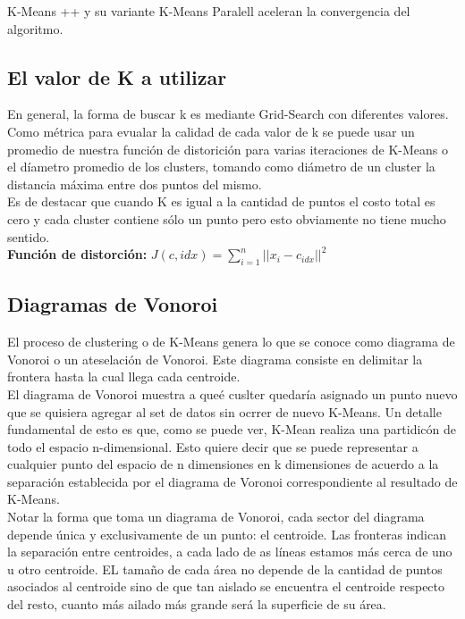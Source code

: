 \documentclass[titlepage,a4paper]{article}
\begin{document}
K-Means ++ y su variante K-Means Paralell aceleran la convergencia del algoritmo. 

\subsection*{El valor de K a utilizar}
En general, la forma de buscar k es mediante Grid-Search con diferentes valores. Como métrica para evualar la calidad de cada valor de k se puede usar un promedio de nuestra función de distorición para varias iteraciones de K-Means o el díametro promedio de los clusters, tomando como diámetro de un cluster la distancia máxima entre dos puntos del mismo. \\ 

Es de destacar que cuando K es igual a la cantidad de puntos el costo total es cero y cada cluster contiene sólo un punto pero esto obviamente no tiene mucho sentido. \\

\textbf{Función de distorción:} $J(c, idx) = \sum_{i=1}^{n} || x_i - c_{idx} ||^2$

\subsection*{Diagramas de Vonoroi}
El proceso de clustering o de K-Means genera lo que se conoce como diagrama de Vonoroi o un ateselación de Vonoroi. Este diagrama consiste en delimitar la frontera hasta la cual llega cada centroide.\\

El diagrama de Vonoroi muestra a queé cuslter quedaría asignado un punto nuevo que se quisiera agregar al set de datos sin ocrrer de nuevo K-Means. Un detalle fundamental de esto es que, como se puede ver, K-Mean realiza una partidicón de todo el espacio n-dimensional. Esto quiere decir que se puede representar a cualquier punto del espacio de n dimensiones en k dimensiones de acuerdo a la separación establecida por el diagrama de Voronoi correspondiente al resultado de K-Means. \\

Notar la forma que toma un diagrama de Vonoroi, cada sector del diagrama depende única y exclusivamente de un punto: el centroide. Las fronteras indican la separación entre centroides, a cada lado de as líneas estamos más cerca de uno u otro centroide. EL tamaño de cada área no depende de la cantidad de puntos asociados al centroide sino de que tan aislado se encuentra el centroide respecto del resto, cuanto más ailado más grande será la superficie de su área. 
\end{document}
